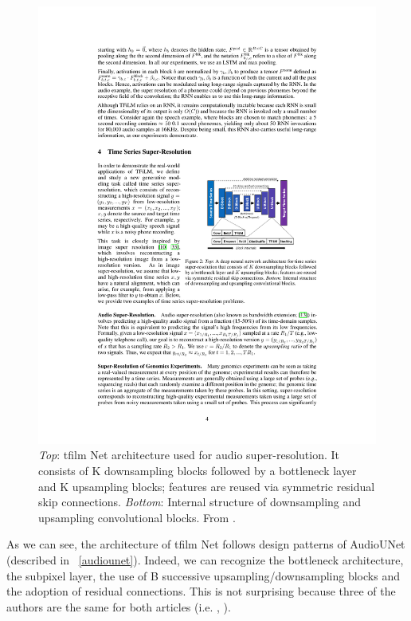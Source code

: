 \begin{figure}[H]
	\begin{center}
		\includegraphics[scale=1.9]{img/tfilm_bottleneck.pdf}
		\captionsetup{margin=2cm}
		\caption{\textit{Top}: \gls{tfilm} Net architecture used for audio super-resolution. It consists of K downsampling blocks followed by a bottleneck layer and K upsampling blocks; features are reused via symmetric residual skip connections. \textit{Bottom}: Internal structure of downsampling and upsampling convolutional blocks. From \cite{birnbaum2019temporal}.}
		\label{fig:tflim_architecture}
	\end{center}
\end{figure}
\noindent As we can see, the architecture of \gls{tfilm} Net follows design patterns of AudioUNet (described in ~\ref{audiounet}). Indeed, we can recognize the bottleneck architecture, the subpixel layer, the use of B successive upsampling/downsampling blocks and the adoption of residual connections. This is not surprising because three of the authors are the same for both articles (i.e. \cite{kuleshov2017audio}, \cite{birnbaum2019temporal}).\\
